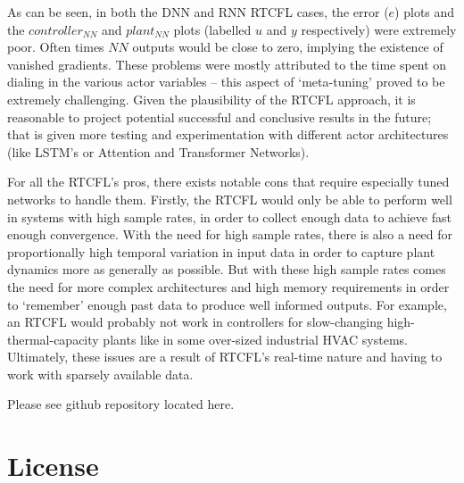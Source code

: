\documentclass[10pt,twocolumn,letterpaper]{article}
\begin{document}
            As can be seen, in both the DNN and RNN RTCFL cases, the error ($e$) plots and the $controller_{NN}$ and
            $plant_{NN}$ plots (labelled $u$ and $y$ respectively) were extremely poor. Often times $NN$ outputs would
            be close to zero, implying the existence of vanished gradients. These problems were mostly attributed to the
            time spent on dialing in the various actor variables -- this aspect of `meta-tuning' proved to be extremely
            challenging. Given the plausibility of the RTCFL approach, it is reasonable to project potential successful
            and conclusive results in the future; that is given more testing and experimentation with different actor
            architectures (like LSTM's or Attention and Transformer Networks).

            For all the RTCFL's pros, there exists notable cons that require especially tuned networks to handle them.
            Firstly, the RTCFL would only be able to perform well in systems with high sample rates, in order to collect
            enough data to achieve fast enough convergence. With the need for high sample rates, there is also a need
            for proportionally high temporal variation in input data in order to capture plant dynamics more as
            generally as possible. But with these high sample rates comes the need for more complex architectures and
            high memory requirements in order to `remember' enough past data to produce well informed outputs. For
            example, an RTCFL would probably not work in controllers for slow-changing high-thermal-capacity plants like
            in some over-sized industrial HVAC systems. Ultimately, these issues are a result of RTCFL's real-time
            nature and having to work with sparsely available data.

            Please see github repository located here\cite{gitrepo}.
 

    {\small
    
    
    \nocite{*} %
    }

    \section*{License}

        \doclicenseThis
\end{document}
